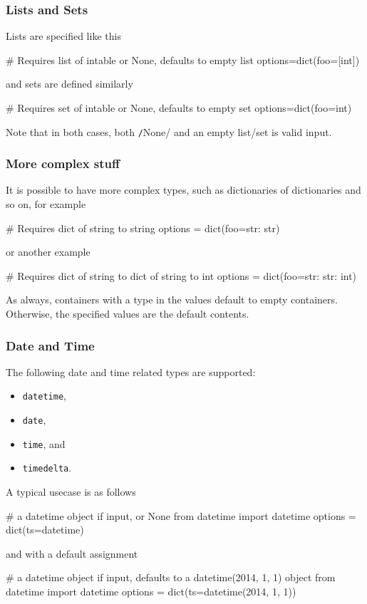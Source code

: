 \subsubsection*{Lists and Sets}
Lists are specified like this
\begin{python}
# Requires list of intable or None, defaults to empty list
options=dict(foo=[int])
\end{python}
and sets are defined similarly
\begin{python}
# Requires set of intable or None, defaults to empty set
options=dict(foo={int})
\end{python}
Note that in both cases, both \texttt/None/ and an empty
list/set is valid input.


\subsubsection*{More complex stuff}
It is possible to have more complex types, such as dictionaries of
dictionaries and so on, for example
\begin{python}
# Requires dict of string to string
options = dict(foo={str: str})
\end{python}
or another example
\begin{python}
# Requires dict of string to dict of string to int
options = dict(foo={str: {str: int}})
\end{python}
As always, containers with a type in the values default to empty
containers.  Otherwise, the specified values are the default contents.



\subsubsection*{Date and Time}
The following date and time related types are supported:
\begin{itemize}
\item[] \texttt{datetime},
\item[] \texttt{date},
\item[] \texttt{time}, and
\item[] \texttt{timedelta}.
\end{itemize}
A typical usecase is as follows
\begin{python}
# a datetime object if input, or None
from datetime import datetime
options = dict(ts=datetime)
\end{python}
and with a default assignment
\begin{python}
#  a datetime object if input, defaults to a datetime(2014, 1, 1) object
from datetime import datetime
options = dict(ts=datetime(2014, 1, 1))
\end{python}



